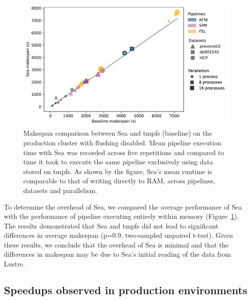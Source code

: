 \documentclass[pdflatex,sn-mathphys-num]{sn-jnl}
\theoremstyle{thmstyleone}%
\theoremstyle{thmstyletwo}%
\theoremstyle{thmstylethree}%
\begin{document}
\begin{figure}[t]
\centering
\includegraphics[width=\textwidth]{figures/beluga_sea_tmpfs_updated.pdf}%
\caption{Makespan comparison between Sea and tmpfs (baseline) on the production cluster with flushing disabled. Mean pipeline execution time with Sea was recorded across five repetitions and compared
to time it took to execute the same pipeline exclusively using data stored on tmpfs.
As shown by the figure, Sea's mean runtime is comparable to that of writing directly to RAM, across pipelines, datasets and parallelism.}
\label{fig:seaneuro:tmpfs}
\end{figure}

To determine the overhead of Sea, we compared the average performance of Sea with
the performance of pipeline executing entirely within memory
(Figure~\ref{fig:seaneuro:tmpfs}). The results demonstrated that Sea and tmpfs
did not lead to significant differences in average makespan (p=0.9, two-sampled unpaired t-test). Given these results, we conclude that the
overhead of Sea is minimal and that the differences in makespan may be
due to Sea's initial reading of the data from Lustre.


\subsection{Speedups observed in production environments}

  
\end{document}
